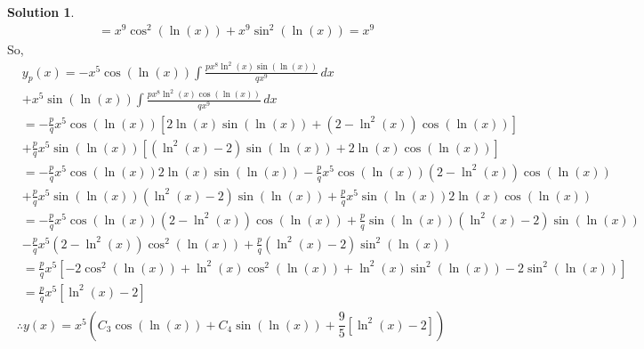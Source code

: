 \documentclass[10pt]{article}
\theoremstyle{definition}
\newtheorem{soln}{Solution}
\begin{document}
\begin{soln}
\begin{align*}
     & = x^9\cos^2\left(\ln(x)\right)+x^9\sin^2\left(\ln(x)\right) = x^9
  \end{align*}
  So,
  \begin{align*}
     & y_p(x)=-x^5\cos\left(\ln(x)\right)\int\frac{px^{8}\ln^2\left(x\right)\sin\left(\ln(x)\right)}{qx^9}\,dx \\
     & +x^5\sin\left(\ln(x)\right)\int\frac{px^{8}\ln^2\left(x\right)\cos\left(\ln(x)\right)}{qx^9}\,dx  \\
     & =-\frac{p}{q}x^5\cos\left(\ln(x)\right)\left[2\ln(x)\sin\left(\ln(x)\right)+\left(2-\ln^2(x)\right)\cos\left(\ln(x)\right)\right] \\
     & +\frac{p}{q}x^5\sin\left(\ln(x)\right)\left[\left(\ln^2(x)-2\right)\sin\left(\ln(x)\right)+2\ln(x)\cos\left(\ln(x)\right)\right]  \\
     & =-\frac{p}{q}x^5\cos\left(\ln(x)\right)2\ln(x)\sin\left(\ln(x)\right)-\frac{p}{q}x^5\cos\left(\ln(x)\right)\left(2-\ln^2(x)\right)\cos\left(\ln(x)\right) \\
     & +\frac{p}{q}x^5\sin\left(\ln(x)\right)\left(\ln^2(x)-2\right)\sin\left(\ln(x)\right)+\frac{p}{q}x^5\sin\left(\ln(x)\right)2\ln(x)\cos\left(\ln(x)\right)  \\
     & = -\frac{p}{q}x^5\cos\left(\ln(x)\right)\left(2-\ln^2(x)\right)\cos\left(\ln(x)\right)+\frac{p}{q}\sin\left(\ln(x)\right)\left(\ln^2(x)-2\right)\sin\left(\ln(x)\right) \\
     & -\frac{p}{q}x^5\left(2-\ln^2(x)\right)\cos^2\left(\ln(x)\right)+\frac{p}{q}\left(\ln^2(x)-2\right)\sin^2\left(\ln(x)\right)                                             \\
     & = \frac{p}{q}x^5\left[-2\cos^2\left(\ln(x)\right)+\ln^2(x)\cos^2\left(\ln(x)\right)+\ln^2(x)\sin^2\left(\ln(x)\right)-2\sin^2\left(\ln(x)\right)\right]                 \\
     & = \frac{p}{q}x^5\left[\ln^2(x)-2\right]                                                                                                                                  \\
  \end{align*}
  $$\therefore y(x)=x^5\left(C_3\cos\left(\ln(x)\right)+C_4\sin\left(\ln(x)\right)+\frac{9}{5}\left[\ln^2(x)-2\right]\right) $$
\end{soln}
\end{document}
